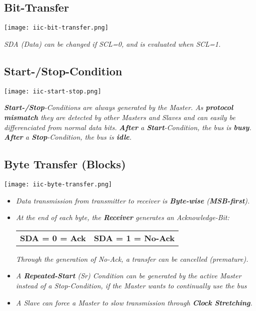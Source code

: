 \subsection{Bit-Transfer}

\texttt{[image: iic-bit-transfer.png]}

\textit{
    SDA (Data) can be changed if SCL=0, \newline
    and is evaluated when SCL=1.
}

\subsection{Start-/Stop-Condition}

\texttt{[image: iic-start-stop.png]}

\textit{
    \textbf{Start-/Stop}-Conditions are always generated by the Master.
    As \textbf{protocol mismatch} they are detected by other Masters and
    Slaves and can easily be differenciated from normal data bits.
    \newline
}
\textit{
    \textbf{After} a \textbf{Start}-Condition, the bus is \textbf{busy}. \newline
}
\textit{
    \textbf{After} a \textbf{Stop}-Condition, the bus is \textbf{idle}.
}

\subsection{Byte Transfer (Blocks)}

\texttt{[image: iic-byte-transfer.png]}

\begin{itemize}
    \item{
        \textit{
            Data transmission from transmitter to receiver is \textbf{Byte-wise} (\textbf{MSB-first}).
        }
    }
    \item{
        \textit{
            At the end of each byte, the \textbf{Receiver} generates an Acknowledge-Bit:
        }
        \begin{tabular}{cc}
            \textbf{SDA = 0 = Ack} & \textbf{SDA = 1 = No-Ack} \\
        \end{tabular}
        \textit{
            Through the generation of No-Ack, a transfer can be cancelled (premature).
        }
    }
    \item{
        \textit{
            A \textbf{Repeated-Start} (Sr) Condition can be generated by the active Master
            instead of a Stop-Condition, if the Master wants to continually use the bus
        }
    }
    \item{
        \textit{
            A Slave can force a Master to slow transmission through \textbf{Clock Stretching}.
        }
    }
\end{itemize}

